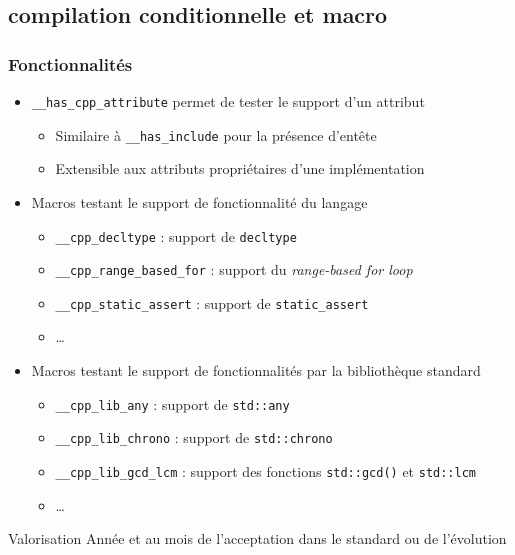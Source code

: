\documentclass[C++.tex]{subfiles}
\begin{document}
\subsection*{compilation conditionnelle et macro}
\begin{frame}[fragile]
	\frametitle{Fonctionnalités}
	\begin{itemize}
		\item \lstinline|__has_cpp_attribute| permet de tester le support d'un attribut
		\begin{itemize}
			\item Similaire à \lstinline|__has_include| pour la présence d'entête
			\item Extensible aux attributs propriétaires d'une implémentation
		\end{itemize}
		\item Macros testant le support de fonctionnalité du langage
		\begin{itemize}
			\item \lstinline|__cpp_decltype| : support de \lstinline|decltype|
			\item \lstinline|__cpp_range_based_for| : support du \textit{range-based for loop}
			\item \lstinline|__cpp_static_assert| : support de \lstinline|static_assert|
			\item \ldots
		\end{itemize}
		\item Macros testant le support de fonctionnalités par la bibliothèque standard
		\begin{itemize}
			\item \lstinline|__cpp_lib_any| : support de \lstinline|std::any|
			\item \lstinline|__cpp_lib_chrono| : support de \lstinline|std::chrono|
			\item \lstinline|__cpp_lib_gcd_lcm| : support des fonctions \lstinline|std::gcd()| et \lstinline|std::lcm|
			\item \ldots
		\end{itemize}
	\end{itemize}

	\begin{block}{Valorisation}
		Année et au mois de l'acceptation dans le standard ou de l'évolution

	\end{block}
\end{frame}
\end{document}
